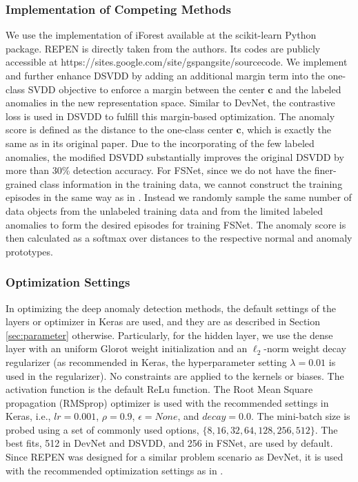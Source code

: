 \documentclass[sigconf]{acmart}
\begin{document}
\subsubsection{Implementation of Competing Methods}
We use the implementation of iForest available at the scikit-learn Python package. REPEN is directly taken from the authors. Its codes are publicly accessible at https://sites.google.com/site/gspangsite/sourcecode. We implement and further enhance DSVDD by adding an additional margin term into the one-class SVDD objective to enforce a margin between the center $\mathbf{c}$ and the labeled anomalies in the new representation space. Similar to DevNet, the contrastive loss \cite{hadsell2006contrastloss} is used in DSVDD to fulfill this margin-based optimization. The anomaly score is defined as the distance to the one-class center $\mathbf{c}$, which is exactly the same as in its original paper. Due to the incorporating of the few labeled anomalies, the modified DSVDD substantially improves the original DSVDD by more than 30\% detection accuracy. For FSNet, since we do not have the finer-grained class information in the training data, we cannot construct the training episodes in the same way as in \cite{snell2017protonet}. Instead we randomly sample the same number of data objects from the unlabeled training data and from the limited labeled anomalies to form the desired episodes for training FSNet. The anomaly score is then calculated as a softmax over distances to the respective normal and anomaly prototypes.


\subsubsection{Optimization Settings} In optimizing the deep anomaly detection methods, the default settings of the layers or optimizer in Keras are used, and they are as described in Section \ref{sec:parameter} otherwise. Particularly, for the hidden layer, we use the dense layer with an uniform Glorot weight initialization and an $\ell_2$-norm weight decay regularizer (as recommended in Keras, the hyperparameter setting $\lambda=0.01$ is used in the regularizer). No constraints are applied to the kernels or biases. The activation function is the default ReLu function. The Root Mean Square propagation (RMSprop) optimizer is used with the recommended settings in Keras, i.e., $\mathit{lr}=0.001$, $\rho=0.9$, $\epsilon=\mathit{None}$, and $\mathit{decay}=0.0$. The mini-batch size is probed using a set of commonly used options, $\{8, 16, 32, 64, 128, 256, 512\}$. The best fits, 512 in DevNet and DSVDD, and 256 in FSNet, are used by default. Since REPEN was designed for a similar problem scenario as DevNet, it is used with the recommended optimization settings as in \cite{pang2018repen}.
\end{document}
